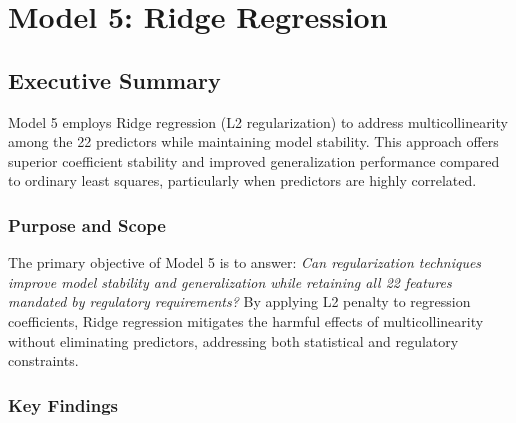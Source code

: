 \chapter{Model 5: Ridge Regression}\label{ch:model5}




\def\themodel{5}

\section{Executive Summary}

Model 5 employs Ridge regression (L2 regularization) to address multicollinearity among the 22 predictors while maintaining model stability. This approach offers superior coefficient stability and improved generalization performance compared to ordinary least squares, particularly when predictors are highly correlated.

\subsection{Purpose and Scope}

The primary objective of Model 5 is to answer: \textit{Can regularization techniques improve model stability and generalization while retaining all 22 features mandated by regulatory requirements?} By applying L2 penalty to regression coefficients, Ridge regression mitigates the harmful effects of multicollinearity without eliminating predictors, addressing both statistical and regulatory constraints.

\subsection{Key Findings}


